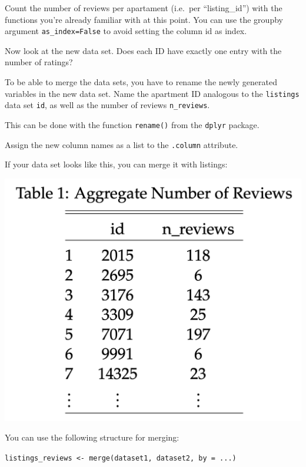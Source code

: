 \documentclass[
  11pt,
]{article}
\newenvironment{tips}[1]
  {
  \begin{itemize}
  \footnotesize
  \renewcommand{\labelitemi}{
    \raisebox{-.7\height}[0pt][0pt]{
      {\setkeys{Gin}{width=3em,keepaspectratio}
        \texttt{[image: images/\#1.png]}}
    }
  }
  \setlength{\fboxsep}{1em}
  \begin{rbox}
  \item
  }
  {
  \end{rbox}
  \end{itemize}
  }
\newenvironment{tipsp}[1]
  {
  \begin{itemize}
  \footnotesize
  \renewcommand{\labelitemi}{
    \raisebox{-.7\height}[0pt][0pt]{
      {\setkeys{Gin}{width=3em,keepaspectratio}
        \texttt{[image: images/\#1.png]}}
    }
  }
  \setlength{\fboxsep}{1em}
  \begin{pbox}
  \item
  }
  {
  \end{pbox}
  \end{itemize}
  }
\begin{document}
\begin{tipsp}p

Count the number of reviews per apartament (i.e.~per ``listing\_id'') with the functions you're already familiar with at this point. You can use the groupby argument \texttt{as\_index=False} to avoid setting the column id as index.

\end{tipsp}

Now look at the new data set. Does each ID have exactly one entry with the number of ratings?

To be able to merge the data sets, you have to rename the newly generated variables in the new data set. Name the apartment ID analogous to the \texttt{listings} data set \texttt{id}, as well as the number of reviews \texttt{n\_reviews}.

\begin{tips}r

This can be done with the function \texttt{rename()} from the \texttt{dplyr} package.

\end{tips}

\begin{tipsp}p

Assign the new column names as a list to the \texttt{.column} attribute.

\end{tipsp}

If your data set looks like this, you can merge it with listings:

\begin{center}\includegraphics[width=0.4\linewidth]{plot/2_merging_table} \end{center}

\begin{tips}r

You can use the following structure for merging:

\texttt{listings\_reviews\ \textless{}-\ merge(dataset1,\ dataset2,\ by\ =\ ...)}

\end{tips}
\end{document}
